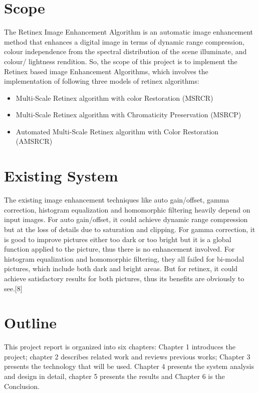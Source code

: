 \section{Scope}
The Retinex Image Enhancement Algorithm is an automatic image enhancement method that enhances a digital image in terms of dynamic range compression, colour independence from the spectral distribution of the scene illuminate, and colour/ lightness rendition. So, the scope of this project is to implement the Retinex based image Enhancement Algorithms, which involves the implementation of following three models of retinex algorithms:
	\begin{itemize}
		\item Multi-Scale Retinex algorithm with color Restoration (MSRCR)
		\item Multi-Scale Retinex algorithm with Chromaticity Preservation (MSRCP)
		\item Automated Multi-Scale Retinex algorithm with Color Restoration (AMSRCR)

	\end{itemize}
\section{Existing System}
The existing image enhancement techniques like auto gain/offset, gamma correction, histogram equalization and homomorphic filtering heavily depend on input images. For auto gain/offset, it could achieve dynamic range compression but at the loss of details due to saturation and clipping. For gamma correction, it is good to improve pictures either too dark or too bright but it is a global function applied to the picture, thus there is no enhancement involved. For histogram equalization and homomorphic filtering, they all failed for bi-modal pictures, which include both dark and bright areas. But for retinex, it could achieve satisfactory results for both pictures, thus its benefits are obviously to see.[8]
\section{Outline}
This project report is organized into six chapters: Chapter 1 introduces the project; chapter 2 describes related work and reviews previous works; Chapter 3 presents the technology that will be used. Chapter 4 presents the system analysis and design in detail, chapter 5 presents the results and Chapter 6 is the Conclusion.